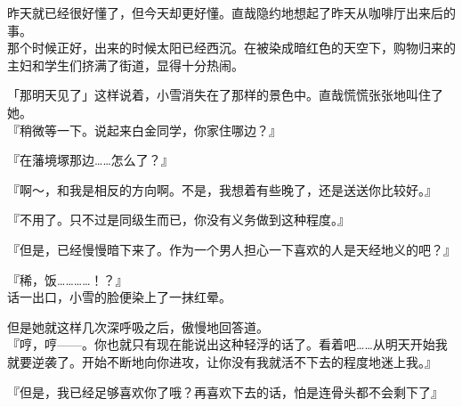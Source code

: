 昨天就已经很好懂了，但今天却更好懂。直哉隐约地想起了昨天从咖啡厅出来后的事。\\

那个时候正好，出来的时候太阳已经西沉。在被染成暗红色的天空下，购物归来的主妇和学生们挤满了街道，显得十分热闹。

「那明天见了」这样说着，小雪消失在了那样的景色中。直哉慌慌张张地叫住了她。\\

『稍微等一下。说起来白金同学，你家住哪边？』

『在藩境塚那边……怎么了？』

『啊～，和我是相反的方向啊。不是，我想着有些晚了，还是送送你比较好。』

『不用了。只不过是同级生而已，你没有义务做到这种程度。』

『但是，已经慢慢暗下来了。作为一个男人担心一下喜欢的人是天经地义的吧？』

『稀，饭…………！？』\\

话一出口，小雪的脸便染上了一抹红晕。

但是她就这样几次深呼吸之后，傲慢地回答道。\\

『哼，哼——。你也就只有现在能说出这种轻浮的话了。看着吧……从明天开始我就要逆袭了。开始不断地向你进攻，让你没有我就活不下去的程度地迷上我。』

『但是，我已经足够喜欢你了哦？再喜欢下去的话，怕是连骨头都不会剩下了』

